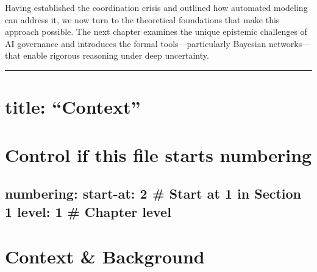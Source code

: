 \documentclass[
  11pt,
  letterpaper,
]{book}
\begin{document}
Having established the coordination crisis and outlined how automated
modeling can address it, we now turn to the theoretical foundations that
make this approach possible. The next chapter examines the unique
epistemic challenges of AI governance and introduces the formal
tools---particularly Bayesian networks---that enable rigorous reasoning
under deep uncertainty.

\begin{center}\rule{0.5\linewidth}{0.5pt}\end{center}


\chapter{title: ``Context''}\label{title-context}


\chapter{Control if this file starts
numbering}\label{control-if-this-file-starts-numbering-2}

\section{numbering: start-at: 2 \# Start at 1 in Section 1 level: 1 \#
Chapter
level}\label{numbering-start-at-2-start-at-1-in-section-1-level-1-chapter-level}


\chapter{Context \& Background}\label{sec-context}
\end{document}
